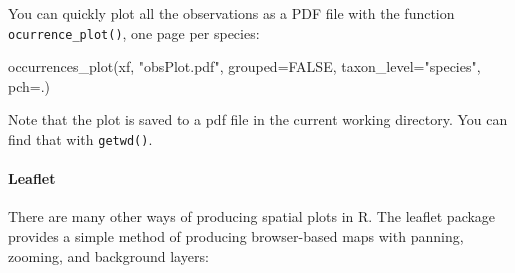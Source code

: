 \documentclass[
  10pt,
]{article}
\newenvironment{Shaded}{\begin{snugshade}}{\end{snugshade}}
\newcommand{\AttributeTok}[1]{\textcolor[rgb]{0.77,0.63,0.00}{#1}}
\newcommand{\CommentTok}[1]{\textcolor[rgb]{0.56,0.35,0.01}{\textit{#1}}}
\newcommand{\ConstantTok}[1]{\textcolor[rgb]{0.00,0.00,0.00}{#1}}
\newcommand{\DecValTok}[1]{\textcolor[rgb]{0.00,0.00,0.81}{#1}}
\newcommand{\FunctionTok}[1]{\textcolor[rgb]{0.00,0.00,0.00}{#1}}
\newcommand{\NormalTok}[1]{#1}
\newcommand{\OtherTok}[1]{\textcolor[rgb]{0.56,0.35,0.01}{#1}}
\newcommand{\SpecialCharTok}[1]{\textcolor[rgb]{0.00,0.00,0.00}{#1}}
\newcommand{\StringTok}[1]{\textcolor[rgb]{0.31,0.60,0.02}{#1}}
\begin{document}
You can quickly plot all the observations as a PDF file with the function \texttt{ocurrence\_plot()}, one page per species:

\begin{Shaded}
\begin{Highlighting}[]
\FunctionTok{occurrences\_plot}\NormalTok{(xf, }\StringTok{"obsPlot.pdf"}\NormalTok{, }
                 \AttributeTok{grouped=}\ConstantTok{FALSE}\NormalTok{, }
                 \AttributeTok{taxon\_level=}\StringTok{"species"}\NormalTok{, }
                 \AttributeTok{pch=}\StringTok{\textquotesingle{}.\textquotesingle{}}\NormalTok{)}
\end{Highlighting}
\end{Shaded}

Note that the plot is saved to a pdf file in the current working directory. You can find that with \texttt{getwd()}.

\hypertarget{leaflet}{%
\paragraph{Leaflet}\label{leaflet}}

There are many other ways of producing spatial plots in R. The leaflet package provides a simple method of producing browser-based maps with panning, zooming, and background layers:

\begin{Shaded}
\end{Shaded}
\end{document}
